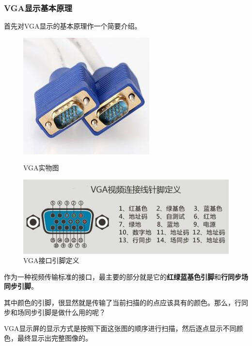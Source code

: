 \documentclass[UTF8]{article}
\begin{document}
	\subsubsection{VGA显示基本原理}
	首先对VGA显示的基本原理作一个简要介绍。\par
	\begin{figure}[H]
		\begin{minipage}[H]{0.48\linewidth}
			\centering
			\includegraphics[scale=0.45]{VGA_real_product.jpg}
			\caption{VGA实物图}
			\label{VGA_real_product}
		\end{minipage}
		\quad
		\begin{minipage}[H]{0.48\linewidth}
			\centering
			\includegraphics[scale=0.45]{VGA_interface.jpg}
			\caption{VGA接口引脚定义}
			\label{VGA_interface}
		\end{minipage}
	\end{figure}\par
	作为一种视频传输标准的接口，最主要的部分就是它的\textbf{红绿蓝基色引脚}和\textbf{行同步场同步引脚}。\par
	其中颜色的引脚，很显然就是传输了当前扫描的的点应该具有的颜色。那么，行同步和场同步引脚是做什么用的呢？\par
	VGA显示屏的显示方式是按照下面这张图的顺序进行扫描，然后逐点显示不同颜色，最终显示出完整图像的。\par
\end{document}
